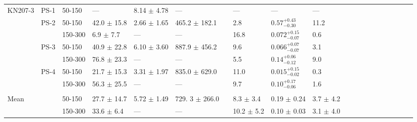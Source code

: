\begin{landscape}
\begin{scriptsize}
\begin{singlespace}
\begin{flushleft}
\begin{longtable}{ Lp{.055\linewidth} Lp{.03\linewidth} Lp{.09\linewidth} Lp{.105\linewidth} Lp{.105\linewidth} Lp{.105\linewidth} Lp{.02\linewidth} Lp{.105\linewidth} Lp{.105\linewidth} Lp{.105\linewidth} }
KN207-3 & PS-1 & 50-150 & --- & 8.14 $\pm$ 4.78 & --- &  & --- & --- & --- \\

 & PS-2 & 50-150 & 42.0 $\pm$ 15.8 & 2.66 $\pm$ 1.65 & 465.2 $\pm$ 182.1 &  & 2.8 & $0.57_{ - 0.30}^{ + 0.43}$ & 11.2 \\

 &  & 150-300 & 6.9 $\pm$ 7.7 & --- & --- &  & 16.8 & $0.072_{ - 0.07}^{ + 0.15}$ & 0.6 \\

 & PS-3 & 50-150 & 40.9 $\pm$ 22.8 & 6.10 $\pm$ 3.60 & 887.9 $\pm$ 456.2 &  & 9.6 & $0.066_{ - 0.07}^{ + 0.07}$ & 3.1 \\

 &  & 150-300 & 76.8 $\pm$ 23.3 & --- & --- &  & 5.5 & $0.14_{ - 0.12}^{ + 0.06}$ & 9.0 \\

 & PS-4 & 50-150 & 21.7 $\pm$ 15.3 & 3.31 $\pm$ 1.97 & 835.0 $\pm$ 629.0 &  & 11.0 & $0.015_{ - 0.02}^{ + 0.15}$ & 0.3 \\

 &  & 150-300 & 56.3 $\pm$ 25.5 & --- & --- &  & 9.7 & $0.10_{ - 0.06}^{ + 0.17}$ & 1.6 \\

 &  &  &  &  &  &  &  &  &  \\

Mean &  & 50-150 & 27.7 $\pm$ 14.7 & 5.72 $\pm$ 1.49 & 729. 3 $\pm$ 266.0 &  & 8.3 $\pm$ 3.4 & 0.19 $\pm$ 0.24 & 3.7 $\pm$ 4.2 \\

 &  & 150-300 & 33.6 $\pm$ 6.4 & --- & --- &  & 10.2 $\pm$ 5.2 & 0.10 $\pm$ 0.03 & 3.1 $\pm$ 4.0 \\


\end{longtable}
\end{flushleft}
\end{singlespace}
\end{scriptsize}
\end{landscape}
